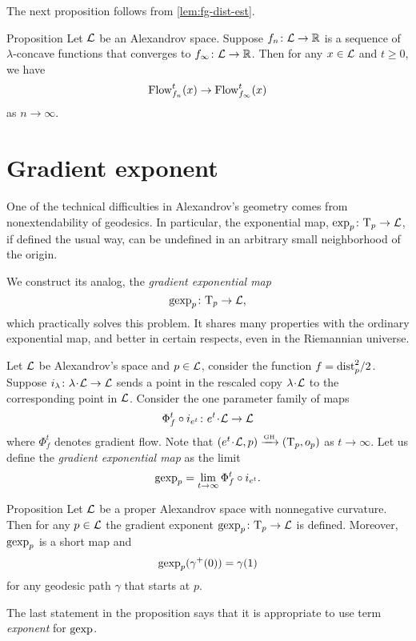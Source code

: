 The next proposition follows from \ref{lem:fg-dist-est}.

\begin{thm}{Proposition}\label{grad-curve-conv}
Let $\mathcal{L}$ be an Alexandrov space.
Suppose $f_n\colon\mathcal{L}\to\mathbb{R}$ is a sequence of
$\lambda$-concave functions 
that converges to $f_\infty\colon\mathcal{L}\to \mathbb{R}$. 
Then for any $x\in \mathcal{L}$ and $t\ge 0$, we have
\[\mathop{\rm Flow}\nolimits_{f_n}^t(x)\to \mathop{\rm Flow}\nolimits_{f_\infty}^t(x)\]
as $n\to \infty$.
\end{thm}


\section{Gradient exponent}\label{gexp}

One of the technical difficulties in Alexandrov's geometry comes from
nonextendability of geodesics. 
In particular, the exponential map, $\exp_p\colon\mathrm{T}_p\to \mathcal{L}$, if defined the usual way, can
be undefined in an arbitrary small neighborhood of the origin. 

We construct its analog, the \emph{gradient exponential map} 
\[\operatorname{\rm gexp}\nolimits_p\colon\mathrm{T}_p\to\mathcal{L},\]
which practically solves this problem. 
It shares many properties with the ordinary exponential map, and better in certain respects,
even in the Riemannian universe.

Let $\mathcal{L}$ be Alexandrov's space and $p\in \mathcal{L}$, consider the function $f\z=\distfun_p^2/2$.
Suppose $i_{\lambda}\:\lambda\cdot \spc{L}\to \spc{L}$ sends a point in the rescaled copy $\lambda\cdot\spc{L}$ to the corresponding point in $\mathcal{L}$.
Consider the one parameter family of maps
$$\Phi^t_{f}\circ i_{e^t}\:e^t{\cdot} \spc{L}\to \spc{L}$$
where $\Phi^t_{f}$ denotes gradient flow. 
Note that $(e^t{\cdot} \spc{L},p)\GHto (\T_p,o_p)$ as $t\to\infty$.
Let us define the \textit{gradient exponential map} as the limit
\[\operatorname{\rm gexp}\nolimits_p=\lim_{t\to\infty}\Phi^t_{f}\circ i_{e^t}.\]

\begin{thm}{Proposition}\label{prop:gexp}
Let $\mathcal{L}$ be a proper Alexandrov space with nonnegative curvature.
Then for any $p\in \mathcal{L}$ the gradient exponent $\operatorname{\rm gexp}\nolimits_p\colon\mathrm{T}_p\to\mathcal{L}$ is defined.
Moreover, $\operatorname{\rm gexp}\nolimits_p$ is a short map and 
\[\operatorname{\rm gexp}\nolimits_p(\gamma^+(0))=\gamma(1)\]
for any geodesic path $\gamma$ that starts at $p$.
\end{thm}

The last statement in the proposition says that it is appropriate to use term \textit{exponent} for $\operatorname{\rm gexp}\nolimits$.


